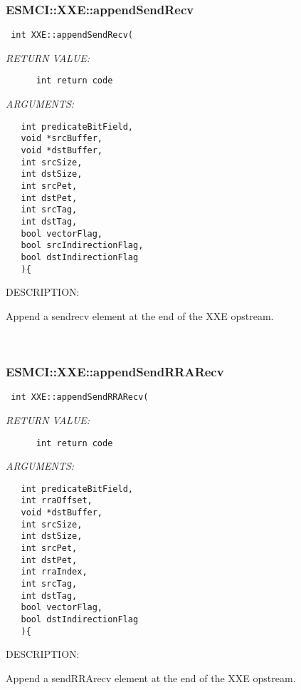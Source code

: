 \subsubsection [ESMCI::XXE::appendSendRecv] {ESMCI::XXE::appendSendRecv}


  
\begin{verbatim} int XXE::appendSendRecv(\end{verbatim}{\em RETURN VALUE:}
\begin{verbatim}      int return code\end{verbatim}{\em ARGUMENTS:}
\begin{verbatim}   int predicateBitField,
   void *srcBuffer,
   void *dstBuffer,
   int srcSize,
   int dstSize,
   int srcPet,
   int dstPet,
   int srcTag,
   int dstTag,
   bool vectorFlag,
   bool srcIndirectionFlag,
   bool dstIndirectionFlag
   ){\end{verbatim}
{\sf DESCRIPTION:\\ }


    Append a sendrecv element at the end of the XXE opstream. 
 
\mbox{}\hrulefill\
 
\subsubsection [ESMCI::XXE::appendSendRRARecv] {ESMCI::XXE::appendSendRRARecv}


  
\begin{verbatim} int XXE::appendSendRRARecv(\end{verbatim}{\em RETURN VALUE:}
\begin{verbatim}      int return code\end{verbatim}{\em ARGUMENTS:}
\begin{verbatim}   int predicateBitField,
   int rraOffset,
   void *dstBuffer,
   int srcSize,
   int dstSize,
   int srcPet,
   int dstPet,
   int rraIndex,
   int srcTag,
   int dstTag,
   bool vectorFlag,
   bool dstIndirectionFlag
   ){\end{verbatim}
{\sf DESCRIPTION:\\ }


    Append a sendRRArecv element at the end of the XXE opstream. 
 
\mbox{}\hrulefill\
 
